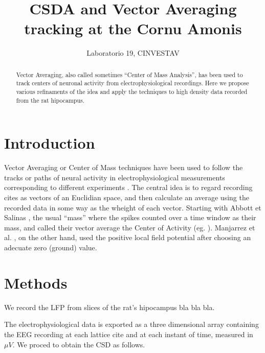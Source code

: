 \documentclass{article}
\title{CSDA and Vector Averaging tracking at the Cornu Amonis}
\author{Laboratorio 19, CINVESTAV}
\begin{document}
\maketitle

\begin{abstract}
Vector Averaging, also called sometimes ``Center of Mass Analysis'', has
been used to track centers of 
neuronal activity from electrophysiological recordings. 
Here we propose various refinaments of the idea and apply the techniques
to high density data recorded from the rat hipocampus. 
\end{abstract}


\section{Introduction}

Vector Averaging or Center of Mass techniques have been used to follow
the tracks or paths of neural activity in electrophysiological
measurements corresponding to different experiments 
\cite{ Abbot94, Chao05, Manjarrez07, Xiong07}. The central
idea is to regard recording cites as vectors of an Euclidian space,
and then calculate an average using the recorded data in some
way as the wheight of each vector. Starting with Abbott et Salinas 
\cite{Abbot94}, the usual ``mass'' where the spikes 
counted over a time window as their mass, and called their
vector average the Center of Activity (eg. \cite{Demas03, Chao05}). 
Manjarrez et al. \cite{Manjarrez07},
on the other hand, used the positive local field potential after choosing
an adecuate zero (ground) value.  
 


\section{Methods}

We record the LFP from slices of the rat's hipocampus bla bla bla.

The electrophysiological data is exported as a three dimensional array
containing the EEG recording at each lattice cite and at each instant
of time, measured in $\mu V$. We proced to obtain the CSD as follows.
\end{document}
